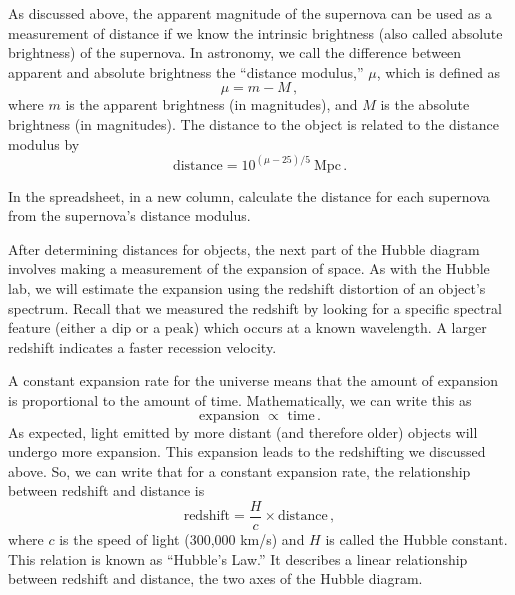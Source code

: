 As discussed above, the apparent magnitude of the supernova can be
used as a measurement of distance if we know the intrinsic brightness
(also called absolute brightness) of the supernova. In astronomy, we call
the difference between apparent and absolute brightness the “distance
modulus,” $\mu$, which is defined as
\begin{equation}
\mu = m - M \,,
\end{equation}
where $m$ is the apparent brightness (in
magnitudes), and $M$ is the absolute brightness (in magnitudes). The
distance to the object is related to the distance modulus by
\begin{equation}
 \textrm{distance} = 10^{(\mu-25)/5}\:\textrm{Mpc} \,.
\end{equation}

\begin{steps}
	\item In the spreadsheet, in a new column, calculate the distance for each supernova from the supernova’s
	distance modulus.
\end{steps}

After determining distances for objects, the next part of the Hubble
diagram involves making a measurement of the expansion of space. As
with the Hubble lab, we will estimate the expansion using the redshift
distortion of an object's spectrum. Recall that we measured the redshift
by looking for a specific spectral feature (either a dip or a peak) which
occurs at a known wavelength. A larger redshift indicates a faster recession velocity.

A constant expansion rate for the universe means that the amount of
expansion is proportional to the amount of time. Mathematically, we can
write this as
\begin{equation}
 \textrm{expansion } \propto \textrm{ time} \,.
\end{equation}
As expected, light emitted by more distant (and therefore older) objects
will undergo more expansion. This expansion leads to the redshifting
we discussed above. So, we can write that for a constant expansion rate,
the relationship between redshift and distance is
\begin{equation}\label{de:eq:hubble}
 \textrm{redshift} = \frac{H}{c} \times \textrm{distance} \,,
\end{equation}
where $c$ is the speed of light (300,000 km/s) and $H$ is called the Hubble
constant. This relation is known as “Hubble’s Law.” It describes a linear
relationship between redshift and distance, the two axes of the Hubble
diagram.

